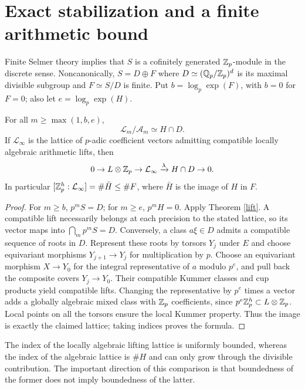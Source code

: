 \documentclass[11pt,a4paper]{article}
\theoremstyle{remark}\newtheorem{remark}[theorem]{Remark}
\begin{document}
\section{Exact stabilization and a finite arithmetic bound}
Finite Selmer theory implies that $S$ is a cofinitely generated $\mathbb Z_p$-module in the discrete sense. Noncanonically, $S=D\oplus F$ where $D\simeq(\mathbb Q_p/\mathbb Z_p)^d$ is its maximal divisible subgroup and $F\simeq S/D$ is finite. Put $b=\log_p\exp(F)$, with $b=0$ for $F=0$; also let $e=\log_p\exp(H)$.
\begin{corollary}\label{stable}
For all $m\ge\max(1,b,e)$,
\[
 \mathcal L_m/\mathcal A_m\simeq H\cap D.
\]
If $\mathcal L_\infty$ is the lattice of $p$-adic coefficient vectors admitting compatible locally algebraic arithmetic lifts, then
\[
 0\to L\otimes\mathbb Z_p\to\mathcal L_\infty\xrightarrow{\lambda} H\cap D\to0.
\]
In particular $[\mathbb Z_p^h:\mathcal L_\infty]=\#\bar H\le\#F$, where $\bar H$ is the image of $H$ in $F$.
\end{corollary}
\begin{proof}
For $m\ge b$, $p^m S=D$; for $m\ge e$, $p^mH=0$. Apply Theorem \ref{lift}. A compatible lift necessarily belongs at each precision to the stated lattice, so its vector maps into $\bigcap_m p^mS=D$. Conversely, a class $a\xi\in D$ admits a compatible sequence of roots in $D$. Represent these roots by torsors $Y_j$ under $E$ and choose equivariant morphisms $Y_{j+1}\to Y_j$ for multiplication by $p$. Choose an equivariant morphism $X\to Y_0$ for the integral representative of $a$ modulo $p^e$, and pull back the composite covers $Y_j\to Y_0$. Their compatible Kummer classes and cup products yield compatible lifts. Changing the representative by $p^e$ times a vector adds a globally algebraic mixed class with $\mathbb Z_p$ coefficients, since $p^e\mathbb Z_p^h\subset L\otimes\mathbb Z_p$. Local points on all the torsors ensure the local Kummer property. Thus the image is exactly the claimed lattice; taking indices proves the formula.
\end{proof}
The index of the locally algebraic lifting lattice is uniformly bounded, whereas the index of the algebraic lattice is $\#H$ and can only grow through the divisible contribution. The important direction of this comparison is that boundedness of the former does not imply boundedness of the latter.
\end{document}
